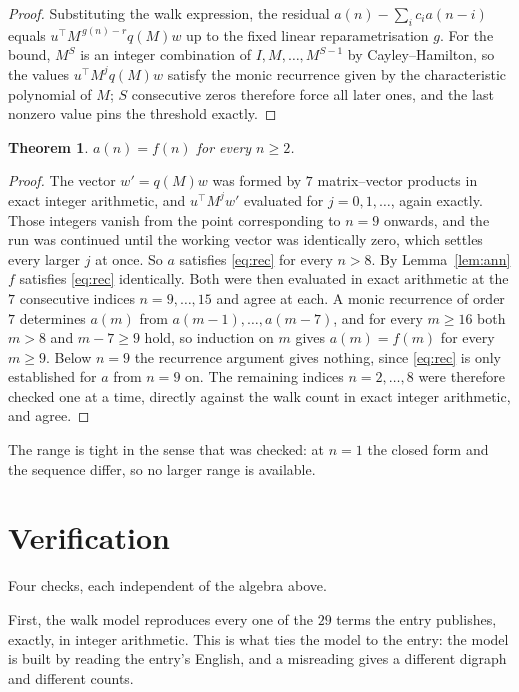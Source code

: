 \documentclass[11pt,a4paper]{article}
\theoremstyle{plain}
\newtheorem{theorem}{Theorem}
\theoremstyle{definition}
\begin{document}
\begin{proof}
Substituting the walk expression, the residual $a(n)-\sum_ic_ia(n-i)$ equals
$u^{\!\top}M^{\,g(n)-r}q(M)w$ up to the fixed linear reparametrisation $g$. For the bound,
$M^{S}$ is an integer combination of $I,M,\dots,M^{S-1}$ by Cayley--Hamilton, so the values
$u^{\!\top}M^{j}q(M)w$ satisfy the monic recurrence given by the characteristic polynomial of
$M$; $S$ consecutive zeros therefore force all later ones, and the last nonzero value pins the
threshold exactly.
\end{proof}

\begin{theorem}
$a(n)=f(n)$ for every $n\ge2$.
\end{theorem}

\begin{proof}
The vector $w'=q(M)w$ was formed by $7$ matrix--vector products in exact integer
arithmetic, and $u^{\!\top}M^{j}w'$ evaluated for $j=0,1,\dots$, again exactly. Those integers
vanish from the point corresponding to $n=9$ onwards, and the run was continued until the
working vector was identically zero, which settles every larger $j$ at once. So $a$ satisfies
\eqref{eq:rec} for every $n>8$. By Lemma~\ref{lem:ann} $f$ satisfies \eqref{eq:rec}
identically. Both were then evaluated in exact arithmetic at the $7$ consecutive indices
$n=9,\dots,15$ and agree at each. A monic recurrence of order $7$
determines $a(m)$ from $a(m-1),\dots,a(m-7)$, and for every $m\ge16$ both
$m>8$ and $m-7\ge9$ hold, so induction on $m$ gives $a(m)=f(m)$ for every
$m\ge9$.
Below $n=9$ the recurrence argument gives nothing, since \eqref{eq:rec} is only
established for $a$ from $n=9$ on. The remaining indices $n=2,\dots,8$ were
therefore checked one at a time, directly against the walk count in exact integer arithmetic,
and agree.
\end{proof}

The range is tight in the sense that was checked: at $n=1$ the closed form and the sequence differ, so no larger range is available.

\section{Verification}

Four checks, each independent of the algebra above.

First, the walk model reproduces every one of the $29$ terms the entry publishes,
exactly, in integer arithmetic. This is what ties the model to the entry: the model is built
by reading the entry's English, and a misreading gives a different digraph and different
counts.
\end{document}
